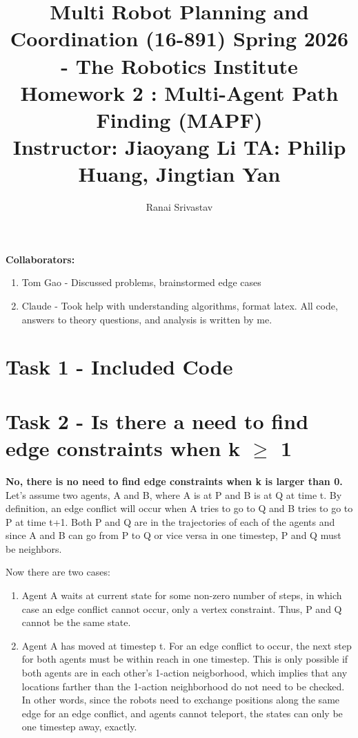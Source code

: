 \documentclass[11pt]{article}
\title
{ 
{\small Multi Robot Planning and Coordination (16-891) Spring 2026 - The Robotics Institute} \\
Homework 2 : Multi-Agent Path Finding (MAPF) \\
{\small Instructor: Jiaoyang Li \;\;\; TA: Philip Huang, Jingtian Yan }\\
}
\author{Ranai Srivastav}
\begin{document}
\maketitle

\textbf{Collaborators:}
\begin{enumerate}
    \item Tom Gao - Discussed problems, brainstormed edge cases
    \item Claude  - Took help with understanding algorithms, format latex.
                    All code, answers to theory questions, and analysis is written by me.
\end{enumerate}

\section*{Task 1 - Included Code}

\section*{Task 2 - Is there a need to find edge constraints when k $\geq$ 1}
    \textbf{No, there is no need to find edge constraints when k is larger than 0.} \\
    Let's assume two agents, A and B, where A is at P and B is at Q at time t.
    By definition, an edge conflict will occur when A tries to go to Q and B tries to go to P at time t+1.
    Both P and Q are in the trajectories of each of the agents and since A and B can go from P to Q or vice versa in one timestep, P and Q must be neighbors.

    Now there are two cases:
    \begin{enumerate}
        \item Agent A waits at current state for some non-zero number of steps, in which case an edge conflict cannot occur, only a vertex constraint. Thus, P and Q cannot be the same state.
        \item Agent A has moved at timestep t.
        For an edge conflict to occur, the next step for both agents must be within reach in one timestep.
        This is only possible if both agents are in each other's 1-action neigborhood, which implies that any locations farther than the 1-action neighborhood do not need to be checked.
        In other words, since the robots need to exchange positions along the same edge for an edge conflict, and agents cannot teleport, the states can only be one timestep away, exactly.
    \end{enumerate}
\end{document}
